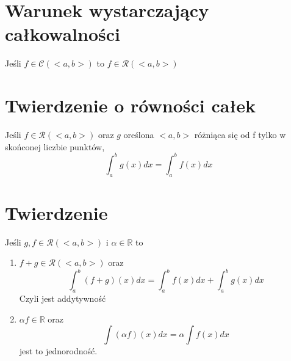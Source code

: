 \documentclass[11pt]{article}
\begin{document}
\section{Warunek wystarczający całkowalności}
Jeśli $f \in \mathcal{C}(<a,b>)$ to $f \in \mathcal{R}(<a,b>)$
\section{Twierdzenie o równości całek}
Jeśli $f \in \mathcal{R}(<a,b>)$ oraz $g$
oreślona $<a,b>$ różniąca się od f tylko w skońconej liczbie punktów, $$ \int_a^b g(x)dx = \int_a^b f(x)dx $$

\section{Twierdzenie}
Jeśli $g,f \in \mathcal{R}(<a,b>)$ i $\alpha \in \mathbb{R}$ to
\begin{enumerate}
\item{$f + g \in \mathcal{R}(<a,b>)$ oraz $$ \int_a^b (f+g)(x)dx = \int_a^b f(x)dx + \int_a^b g(x)dx$$ Czyli jest addytywność}
\item{$\alpha f \in \mathbb{R}$ oraz $$ \int (\alpha f)(x)dx = \alpha \int f(x)dx $$ jest to jednorodność.}
\end{enumerate}
\end{document}
